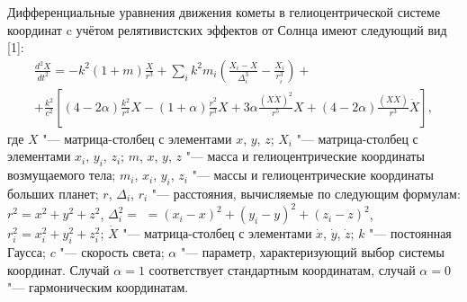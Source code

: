 

\date{20/VII.2009} %


\maketitle

\small

Дифференциальные уравнения движения кометы  в гелиоцентрической системе координат c учётом релятивистских эффектов от Солнца имеют следующий вид [1]:
\begin{multline}
\frac{d^2X}{dt^2}=-k^2(1+m)\frac{X}{r^3}+\sum_i{k^2m_i\left(\frac{X_i-X}{\Delta^3_i}-\frac{X_i}{r^3_i}\right)}+\\
+\frac{k^2}{c^2}\left[ (4-2\alpha)\frac{k^2}{r^4}X- (1+\alpha)\frac{\dot{r}^2}{r^3}X+3\alpha \frac{(X\dot{X})^2}{r^5}X+ (4-2\alpha)\frac{(X\dot{X})}{r^3}\dot{X}\right],
\end{multline}
где $X$ "---  матрица-столбец с элементами $x$, $y$, $z$; $X_i$ "---
матрица-столбец с элементами $x_i$, $y_i$, $z_i$;
$m$, $x$, $y$, $z$ "---
масса и гелиоцентрические координаты возмущаемого тела;
$m_i$, $x_i$, $y_i$, $z_i$ "---  массы и гелиоцентрические координаты больших планет;
$r$, $\Delta_i$, $r_i$ "---  расстояния, вычисляемые по следующим формулам:
$r^2=x^2+y^2+z^2$, $\Delta_i^2=$ \linebreak $= (x_i-x)^2+(y_i-y)^2+(z_i-z)^2$,
$r^2_i=x^2_i+y^2_i+z^2_i$;
$\dot{X}$ "---  матрица-столбец с элементами $\dot{x}$, $\dot{y}$, $\dot{z}$;
$k$ "---  постоянная Гаусса;
$c$ "---  скорость света;
$\alpha$ "---  параметр, характеризующий выбор системы координат.
Случай $\alpha=1$ соответствует стандартным координатам, случай  $\alpha=0$ "--- гармоническим координатам.

